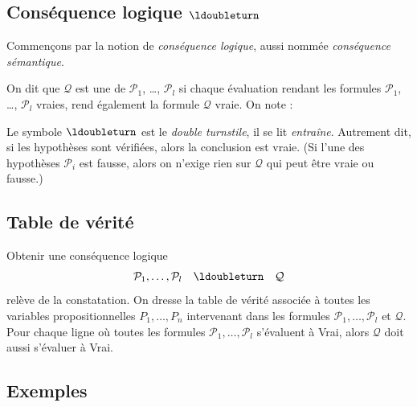 \documentclass[11pt,class=report,crop=false]{standalone}
\begin{document}
\subsection{Conséquence logique $\ldoubleturn$}

Commençons par la notion de \emph{conséquence logique}, aussi nommée \emph{conséquence sémantique}.

\begin{definition}
	On dit que $\mathcal{Q}$ est une  de $\mathcal{P}_1$, \ldots, $\mathcal{P}_l$
	si chaque évaluation rendant les formules $\mathcal{P}_1$, \ldots, $\mathcal{P}_l$ vraies, rend également la formule $\mathcal{Q}$ vraie.
	On note :
\end{definition}

Le symbole $\ldoubleturn$ est le \emph{double turnstile}, il se lit \emph{entraîne}. 
Autrement dit, si les hypothèses sont vérifiées, alors la conclusion est vraie.
(Si l'une des hypothèses $\mathcal{P}_i$ est fausse, alors on n'exige rien sur $\mathcal{Q}$ qui peut être vraie ou fausse.)

\subsection{Table de vérité}

Obtenir une conséquence logique 
\[
\mathcal{P}_1, \ldots, \mathcal{P}_l \quad \ldoubleturn \quad \mathcal{Q}
\]
relève de la constatation. On dresse la table de vérité associée à toutes les variables propositionnelles $P_1,\ldots,P_n$ intervenant dans
les formules $\mathcal{P}_1, \ldots, \mathcal{P}_l$ et $\mathcal{Q}$. 
Pour chaque ligne où toutes les formules $\mathcal{P}_1, \ldots, \mathcal{P}_l$ s'évaluent à Vrai,
alors $\mathcal{Q}$ doit aussi s'évaluer à Vrai.

\subsection{Exemples}
\end{document}

